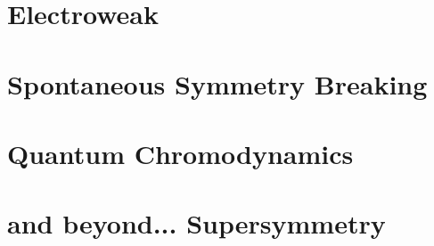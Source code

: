 \section{Electroweak}
\section{Spontaneous Symmetry Breaking}
\section{Quantum Chromodynamics}
\section{and beyond... Supersymmetry}
